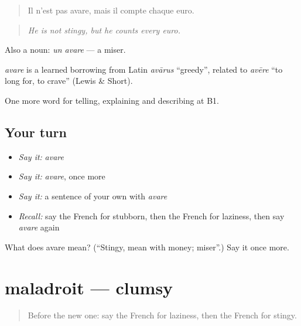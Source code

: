 \begin{quote}
Il n'est pas avare, mais il compte chaque euro.
\end{quote}

\begin{quote}
\emph{He is not stingy, but he counts every euro.}
\end{quote}

Also a noun: \emph{un avare} — a miser.

\begin{cousinweb}
\emph{avare} is a learned borrowing from Latin \emph{avārus} \textquotedblleft{}greedy\textquotedblright{}, related to \emph{avēre} \textquotedblleft{}to long for, to crave\textquotedblright{} (Lewis \& Short).
\end{cousinweb}

\begin{grammarlens}[title={What you've built}]
One more word for telling, explaining and describing at B1.
\end{grammarlens}

\subsection*{Your turn}
\begin{itemize}
\raggedright
  \item \emph{Say it:} \emph{avare}
  \item \emph{Say it:} \emph{avare}, once more
  \item \emph{Say it:} a sentence of your own with \emph{avare}
  \item \emph{Recall:} say the French for stubborn, then the French for laziness, then say \emph{avare} again
\end{itemize}

\begin{tcolorbox}[breakable,colback=teal!4,colframe=teal!35!black,title={Before you move on}]
What does avare mean? (\textquotedblleft{}Stingy, mean with money; miser\textquotedblright{}.) Say it once more.
\end{tcolorbox}
\section[maladroit]{maladroit — clumsy}

\label{lesson:FR-C467-maladroit}



\begin{quote}
Before the new one: say the French for laziness, then the French for stingy.
\end{quote}

